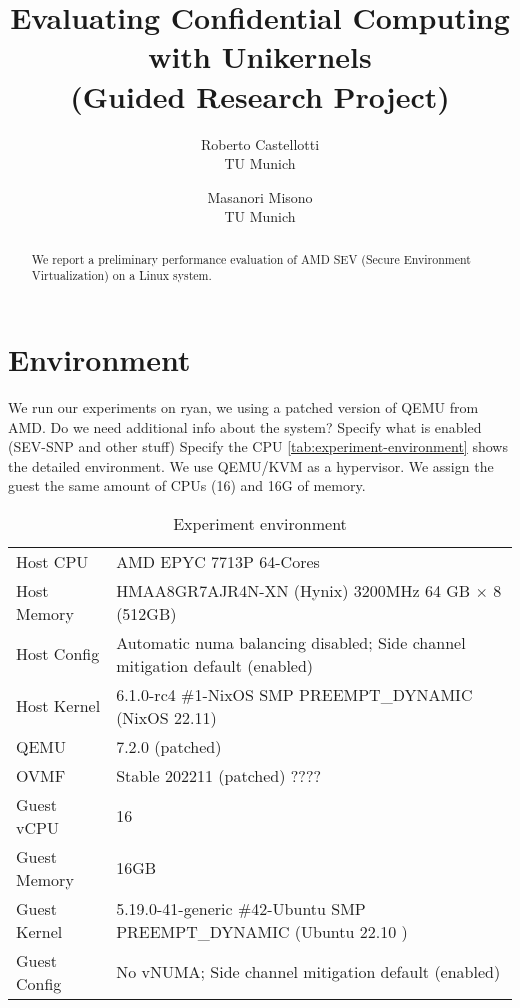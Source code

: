 \documentclass[letterpaper,twocolumn,10pt]{article}
\newcommand{\titlename}{
Evaluating Confidential Computing with Unikernels \\ (Guided Research Project)
}
\begin{document}
\date{}

\title{\Large \bf \titlename}

\author{
{\rm Roberto Castellotti}\\TU Munich
\and
{\rm Masanori Misono}\\TU Munich
}

\maketitle

\begin{abstract}
We report a preliminary performance evaluation of AMD SEV (Secure Environment Virtualization) on a Linux system.
\end{abstract}

\section{Environment}

We run our experiments on ryan, we using a patched version of QEMU from AMD.
Do we need additional info about the system?
Specify what is enabled (SEV-SNP and other stuff)
Specify the CPU
\autoref{tab:experiment-environment} shows the detailed environment.
We use QEMU/KVM as a hypervisor.
We assign the guest the same amount of CPUs (16) and 16G of memory.

\begin{table*}[t]
\centering
\caption{Experiment environment}
\label{tab:experiment-environment}
\begin{tabular}{l|l}
\toprule
    Host CPU      & AMD EPYC 7713P 64-Cores  \\
    Host Memory   & HMAA8GR7AJR4N-XN (Hynix) 3200MHz 64 GB $\times$ 8 (512GB) \\
    Host Config   & Automatic numa balancing disabled; Side channel mitigation default (enabled) \\
    Host Kernel   & 6.1.0-rc4 \#1-NixOS SMP PREEMPT\_DYNAMIC (NixOS 22.11) \\
    QEMU          & 7.2.0 (patched) \\
\midrule
    OVMF          & Stable 202211 (patched) ????  \\
    Guest vCPU    & 16 \\
    Guest Memory  & 16GB  \\
    Guest Kernel  & 5.19.0-41-generic \#42-Ubuntu SMP PREEMPT\_DYNAMIC (Ubuntu 22.10
    ) \\
    Guest Config  & No vNUMA; Side channel mitigation default (enabled) \\
\bottomrule
\end{tabular}
\end{table*}
\end{document}
